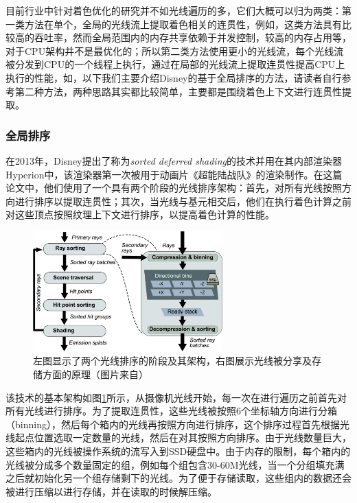 目前行业中针对着色优化的研究并不如光线遍历的多，它们大概可以归为两类：第一类方法在单个，全局的光线流上提取着色相关的连贯性，例如\cite{a:SortedDeferredShadingforProductionPathTracing}，这类方法具有比较高的吞吐率，然而全局范围内的内存共享依赖于并发控制，较高的内存占用等，对于CPU架构并不是最优化的；所以第二类方法使用更小的光线流，每个光线流被分发到CPU的一个线程上执行，通过在局部的光线流上提取连贯性提高CPU上执行的性能，如\cite{a:LocalShadingCoherenceExtractionforSIMD-EfficientPathTracingonCPUs}，以下我们主要介绍Disney的基于全局排序的方法，请读者自行参考第二种方法，两种思路其实都比较简单，主要都是围绕着色上下文进行连贯性提取。






\subsubsection{全局排序} 
在2013年，Disney提出了称为\textit{sorted deferred shading}\cite{a:SortedDeferredShadingforProductionPathTracing}的技术并用在其内部渲染器Hyperion中，该渲染器第一次被用于动画片《超能陆战队》的渲染制作。在这篇论文中，他们使用了一个具有两个阶段的光线排序架构：首先，对所有光线按照方向进行排序以提取连贯性；其次，当光线与基元相交后，他们在执行着色计算之前对这些顶点按照纹理上下文进行排序，以提高着色计算的性能。

\begin{figure}
\sidecaption
	\includegraphics[width=0.65\textwidth]{figures/pt/path-10}
	\caption{左图显示了两个光线排序的阶段及其架构，右图展示光线被分享及存储方面的原理（图片来自\cite{a:SortedDeferredShadingforProductionPathTracing}）}
	\label{f:pt-sorted-deferred-shading}
\end{figure}

该技术的基本架构如图\ref{f:pt-sorted-deferred-shading}所示，从摄像机光线开始，每一次在进行遍历之前首先对所有光线进行排序。为了提取连贯性，这些光线被按照6个坐标轴方向进行分箱（binning），然后每个箱内的光线再按照方向进行排序，这个排序过程首先根据光线起点位置选取一定数量的光线，然后在对其按照方向排序。由于光线数量巨大，这些箱内的光线被操作系统的流写入到SSD硬盘中。由于内存的限制，每个箱内的光线被分成多个数量固定的组，例如每个组包含30-60M光线，当一个分组填充满之后就初始化另一个组存储剩下的光线。为了便于存储读取，这些组内的数据还会被进行压缩以进行存储，并在读取的时候解压缩。

